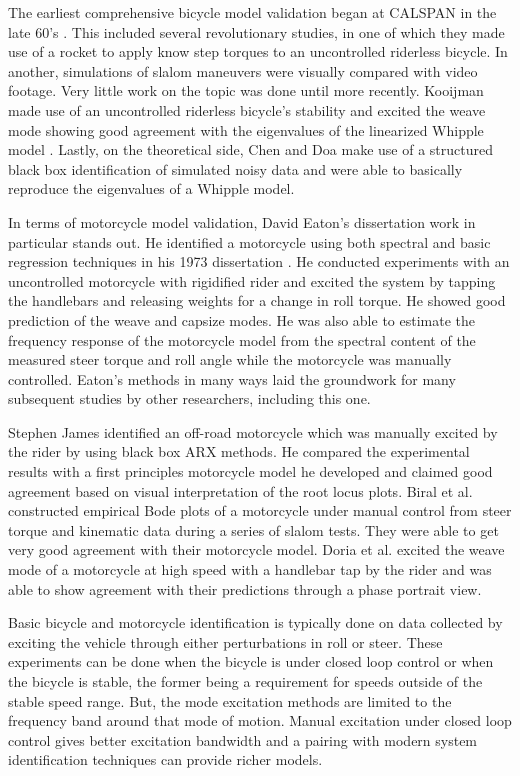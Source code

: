 \documentclass[twocolumn,10pt]{asme2e}
\begin{document}
The earliest comprehensive bicycle model validation began at CALSPAN in the
late 60's \cite{Roland1971}. This included several revolutionary studies, in
one of which they made use of a rocket to apply know step torques to an
uncontrolled riderless bicycle. In another, simulations of slalom maneuvers
were visually compared with video footage. Very little work on the topic was
done until more recently. Kooijman \cite{Kooijman2006, Kooijman2009} made use
of an uncontrolled riderless bicycle's stability and excited the weave mode
showing good agreement with the eigenvalues of the linearized Whipple model
\cite{Whipple1899}. Lastly, on the theoretical side, Chen and Doa
\cite{Chen2010} make use of a structured black box identification of simulated
noisy data and were able to basically reproduce the eigenvalues of a Whipple
model.

In terms of motorcycle model validation, David Eaton's dissertation work in
particular stands out. He identified a motorcycle using both spectral and basic
regression techniques in his 1973 dissertation \cite{Eaton1973}. He conducted
experiments with an uncontrolled motorcycle with rigidified rider and excited
the system by tapping the handlebars and releasing weights for a change in roll
torque. He showed good prediction of the weave and capsize modes.  He was also
able to estimate the frequency response of the motorcycle model from the
spectral content of the measured steer torque and roll angle while the
motorcycle was manually controlled. Eaton's methods in many ways laid the
groundwork for many subsequent studies by other researchers, including this
one.

Stephen James \cite{James2002} identified an off-road motorcycle which was
manually excited by the rider by using black box ARX methods. He compared the
experimental results with a first principles motorcycle model he developed and
claimed good agreement based on visual interpretation of the root locus plots.
Biral et al. \cite{Biral2003} constructed empirical Bode plots of a motorcycle
under manual control from steer torque and kinematic data during a series of
slalom tests. They were able to get very good agreement with their motorcycle
model. Doria et al. \cite{Doria2012} excited the weave mode of a motorcycle at
high speed with a handlebar tap by the rider and was able to show agreement
with their predictions through a phase portrait view.

Basic bicycle and motorcycle identification is typically done on data collected
by exciting the vehicle through either perturbations in roll or steer. These
experiments can be done when the bicycle is under closed loop control or when
the bicycle is stable, the former being a requirement for speeds outside of the
stable speed range. But, the mode excitation methods are limited to the
frequency band around that mode of motion. Manual excitation under closed loop
control gives better excitation bandwidth and a pairing with modern system
identification techniques can provide richer models.
%
\end{document}
